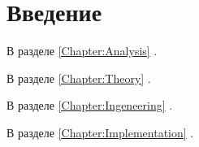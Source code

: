 \chapter*{Введение}

В разделе \ref{Chapter:Analysis} .

В разделе \ref{Chapter:Theory} .

В разделе \ref{Chapter:Ingeneering} .

В разделе \ref{Chapter:Implementation} . 
